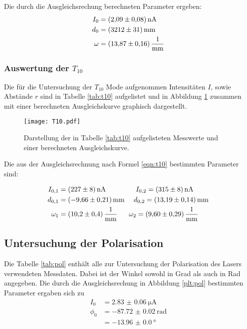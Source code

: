 Die durch die Ausgleichsrechung berechneten Parameter ergeben:
\begin{align*}
  I_0 &= \SI{2.09(8)}{\nano\ampere} \\
  d_0 &= \SI{3212(31)}{\milli\meter} \\
  \omega &= \SI{13.87(16)}{\raiseto{-1}\milli\meter}
\end{align*}

\subsubsection{Auswertung der $T_{10}$}
Die für die Untersuchung der $T_{10}$ Mode aufgenommen Intensitäten $I$,
sowie Abstände $r$ sind in Tabelle \ref{tab:t10} aufgelistet und in
Abbildung \ref{plt:t10} zusammen mit einer berechneten Ausgleichskurve
graphisch dargestellt.


\FloatBarrier

\begin{figure}[htb]
  \centering
  \texttt{[image: T10.pdf]}
  \caption{Darstellung der in Tabelle \ref{tab:t10} aufgelisteten Messwerte und einer berechneten Ausgleichskurve.}
  \label{plt:t10}
\end{figure}
\FloatBarrier

Die aus der Ausgleichsrechnung nach Formel \ref{eqn:t10} bestimmten
Parameter sind:

\begin{align*}
  I_{0,1} &= \SI{227(8)}{\nano\ampere} \ \ \ \ \ \ \ \ \ \ \ \ \ I_{0,2} = \SI{315(8)}{\nano\ampere} \\
  d_{0,1} &= \SI{-9.66(21)}{\milli\meter} \ \ \ \ d_{0,2} = \SI{13.19(14)}{\milli\meter} \\
  \omega_1 &= \SI{10.2(4)}{\raiseto{-1}\milli\meter} \ \ \ \ \ \omega_2 = \SI{9.60(29)}{\raiseto{-1}\milli\meter}
\end{align*}

\subsection{Untersuchung der Polarisation}
Die Tabelle \ref{tab:pol} enthält alle zur Untersuchung der Polarisation
des Lasers verwendeten Messdaten. Dabei ist der Winkel sowohl in Grad als
auch in Rad angegeben.
Die durch die Ausgleichsrechung in Abbildung \ref{plt:pol} bestimmten
Parameter ergaben sich zu
\begin{align*}
  I_0 &= \SI{2.83(6)}{\micro\ampere} \\
  \phi_0 &= \SI{-87.72(2)}{\radian} \\
      &= \SI{-13.96(0)}{\degree}
\end{align*}

